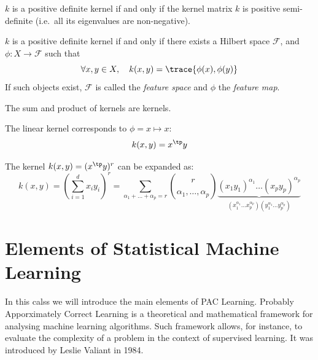 \documentclass{../cs-classes/cs-classes}
\begin{document}
\begin{property}
    $k$ is a positive definite kernel if and only if the kernel matrix $k$ is positive semi-definite (i.e.~all its eigenvalues are non-negative).
\end{property}

\begin{theorem}[Aronsazjn]
    $k$ is a positive definite kernel if and only if there exists a Hilbert space $\mathcal{F}$, and $\phi:X\to\mathcal{F}$ such that
    \begin{equation*}
        \forall x, y\in X, \quad k(x, y) = \trace{\phi(x), \phi(y)}
    \end{equation*}
    If such objects exist, $\mathcal{F}$ is called the \emph{feature space} and $\phi$ the \emph{feature map}.
\end{theorem}

\begin{property}
    The sum and product of kernels are kernels.
\end{property}

\begin{example}
    The linear kernel corresponds to $\phi = x \mapsto x$:
    \begin{equation*}
        k(x, y) = x^\tp y
    \end{equation*}
\end{example}

\begin{example}
    The kernel $k(x, y) = (x^\tp y)^r$ can be expanded as:
    \begin{equation*}
        k(x, y) = \left(\sum_{i=1}^d x_iy_i\right)^r = \sum_{\alpha_1 + \dots + \alpha_p=r} \binom{r}{\alpha_1, \dots, \alpha_p} \underbrace{(x_1y_1)^{\alpha_1} \dots (x_py_p)^{\alpha_p}}_{(x_1^{\alpha_1}\dots x_p^{\alpha_p})(y_1^{\alpha_1}\dots y_p^{\alpha_p})}
    \end{equation*}
\end{example}

\begin{example}
\end{example}

\begin{example}
\end{example}

\section{Elements of Statistical Machine Learning}
In this calss we will introduce the main elements of PAC Learning. Probably Apporximately Correct Learning is a theoretical and mathematical framework for analysing machine learning algorithms. Such framework allows, for instance, to evaluate the complexity of a problem in the context of supervised learning. It was introduced by Leslie Valiant in 1984.
\end{document}
